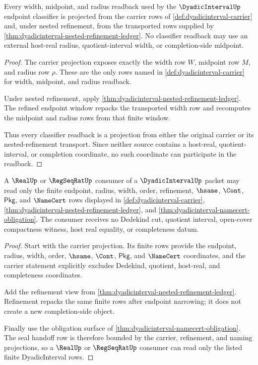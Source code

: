 \begin{theorem}
\label{thm:dyadicinterval-width-radius-ledger-exactness}
Every width, midpoint, and radius readback used by the
$\DyadicIntervalUp$ endpoint classifier is projected from the carrier rows
of \autoref{def:dyadicinterval-carrier} and, under nested refinement, from
the transported rows supplied by
\autoref{thm:dyadicinterval-nested-refinement-ledger}. No classifier
readback may use an external host-real radius, quotient-interval width, or
completion-side midpoint.
\end{theorem}
\begin{proof}
The carrier projection exposes exactly the width row $W$, midpoint row $M$,
and radius row $\rho$. These are the only rows named in
\autoref{def:dyadicinterval-carrier} for width, midpoint, and radius
readback.

Under nested refinement, apply
\autoref{thm:dyadicinterval-nested-refinement-ledger}. The refined endpoint
window repacks the transported width row and recomputes the midpoint and
radius rows from that finite window.

Thus every classifier readback is a projection from either the original
carrier or its nested-refinement transport. Since neither source contains a
host-real, quotient-interval, or completion coordinate, no such coordinate
can participate in the readback.
\end{proof}

\begin{theorem}
\label{thm:dyadicinterval-real-seal-source-boundary}
A $\RealUp$ or $\RegSeqRatUp$ consumer of a $\DyadicIntervalUp$ packet may
read only the finite endpoint, radius, width, order, refinement, $\hsame$,
$\Cont$, $\mathsf{Pkg}$, and $\NameCert$ rows displayed in
\autoref{def:dyadicinterval-carrier},
\autoref{thm:dyadicinterval-nested-refinement-ledger}, and
\autoref{thm:dyadicinterval-namecert-obligation}. The consumer receives no
Dedekind cut, quotient interval, open-cover compactness witness, host real
equality, or completeness datum.
\end{theorem}
\begin{proof}
Start with the carrier projection. Its finite rows provide the endpoint,
radius, width, order, $\hsame$, $\Cont$, $\mathsf{Pkg}$, and $\NameCert$
coordinates, and the carrier statement explicitly excludes Dedekind,
quotient, host-real, and completeness coordinates.

Add the refinement view from
\autoref{thm:dyadicinterval-nested-refinement-ledger}. Refinement repacks
the same finite rows after endpoint narrowing; it does not create a new
completion-side object.

Finally use the obligation surface of
\autoref{thm:dyadicinterval-namecert-obligation}. The seal handoff row is
therefore bounded by the carrier, refinement, and naming projections, so a
$\RealUp$ or $\RegSeqRatUp$ consumer can read only the listed finite
DyadicInterval rows.
\end{proof}

